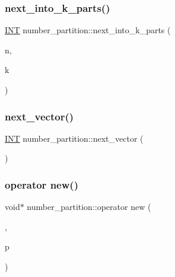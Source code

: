 \mbox{\label{classnumber__partition_a6067c3203b1dbaa8e77bca841132f442}} 
\subsubsection{\texorpdfstring{next\+\_\+into\+\_\+k\+\_\+parts()}{next\_into\_k\_parts()}}
{\footnotesize\ttfamily \mbox{\hyperlink{galois_8h_a09fddde158a3a20bd2dcadb609de11dc}{I\+NT}} number\+\_\+partition\+::next\+\_\+into\+\_\+k\+\_\+parts (\begin{DoxyParamCaption}\item[{\mbox{\hyperlink{galois_8h_a09fddde158a3a20bd2dcadb609de11dc}{I\+NT}}}]{n,  }\item[{\mbox{\hyperlink{galois_8h_a09fddde158a3a20bd2dcadb609de11dc}{I\+NT}}}]{k }\end{DoxyParamCaption})}

\mbox{\label{classnumber__partition_adf30d53b4b6f6511ccbf25f5e9e4187f}} 
\subsubsection{\texorpdfstring{next\+\_\+vector()}{next\_vector()}}
{\footnotesize\ttfamily \mbox{\hyperlink{galois_8h_a09fddde158a3a20bd2dcadb609de11dc}{I\+NT}} number\+\_\+partition\+::next\+\_\+vector (\begin{DoxyParamCaption}{ }\end{DoxyParamCaption})}

\mbox{\label{classnumber__partition_ab36513c3a4dd1353edb3eb7e5b123bad}} 
\subsubsection{\texorpdfstring{operator new()}{operator new()}}
{\footnotesize\ttfamily void$\ast$ number\+\_\+partition\+::operator new (\begin{DoxyParamCaption}\item[{size\+\_\+t}]{,  }\item[{void $\ast$}]{p }\end{DoxyParamCaption})\hspace{0.3cm}{\ttfamily [inline]}}

